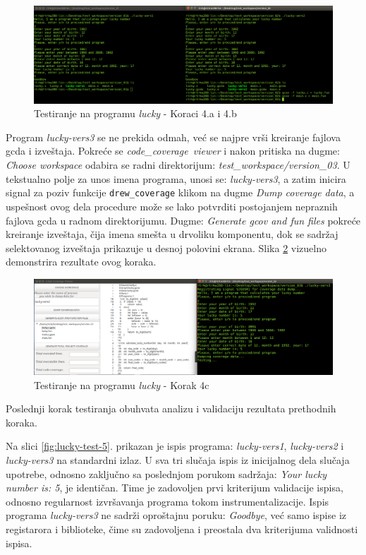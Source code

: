 \documentclass[12pt,oneside]{memoir}
\newcommand{\kod}[1]{\texttt{#1}}
\newcommand{\strano}[1]{\textit{#1}}
\begin{document}
\begin{figure}[!ht]
  \centering
  \includegraphics[width=\textwidth]{img/lucky3.png}
  \caption{Testiranje na programu \strano{lucky} - Koraci 4.a i 4.b}
  \label{fig:lucky-test-3}
\end{figure}

Program \strano{lucky-vers3} se ne prekida odmah, već se najpre vrši kreiranje fajlova gcda i izveštaja. Pokreće se \strano{code\_coverage\ viewer} i nakon pritiska na dugme: \strano{Choose workspace} odabira se radni direktorijum: \strano{test\_workspace/version\_03}. U tekstualno polje za unos imena programa, unosi se: \strano{lucky-vers3}, a zatim inicira signal za poziv funkcije \kod{drew\_coverage} klikom na dugme \strano{Dump coverage data}, a uspešnost ovog dela procedure može se lako potvrditi postojanjem nepraznih fajlova gcda u radnom direktorijumu. Dugme: \strano{Generate gcov and fun files} pokreće kreiranje izveštaja, čija imena smešta u drvoliku komponentu, dok se sadržaj selektovanog izveštaja prikazuje u desnoj polovini ekrana. Slika \ref{fig:lucky-test-4} vizuelno demonstrira rezultate ovog koraka.

\begin{figure}[!ht]
  \centering
  \includegraphics[width=\textwidth]{img/lucky4.png}
  \caption{Testiranje na programu \strano{lucky} - Korak 4c}
  \label{fig:lucky-test-4}
\end{figure}

Poslednji korak testiranja obuhvata analizu i validaciju rezultata prethodnih koraka. 

Na slici \ref{fig:lucky-test-5}. prikazan je ispis programa: \strano{lucky-vers1}, \strano{lucky-vers2} i \strano{lucky-vers3} na standardni izlaz. U sva tri slučaja ispis iz inicijalnog dela slučaja upotrebe, odnosno zaključno sa poslednjom porukom sadržaja: \strano{Your lucky number is: 5}, je identičan. Time je zadovoljen prvi kriterijum validacije ispisa, odnosno regularnost izvršavanja programa tokom instrumentalizacije. Ispis programa \strano{lucky-vers3} ne sadrži oproštajnu poruku: \strano{Goodbye}, već samo ispise iz registarora i biblioteke, čime su zadovoljena i preostala dva kriterijuma validnosti ispisa. 
\end{document}
